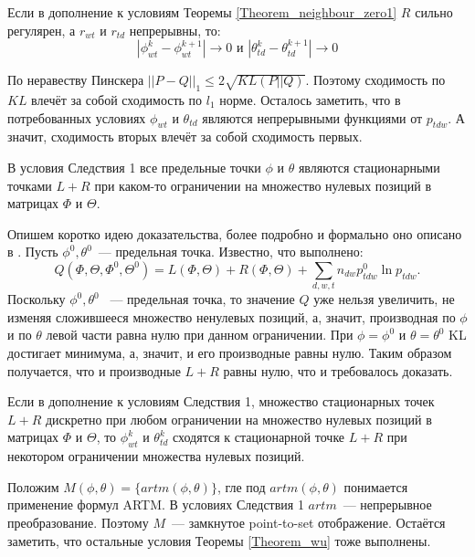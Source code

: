 \documentclass[12pt, twoside]{article}
\begin{document}
\begin{Corollary}
Если в дополнение к условиям Теоремы \ref{Theorem_neighbour_zero1} $R$ сильно регулярен, а $r_{wt}$ и $r_{td}$ непрерывны, то:
\[
|\phi_{wt}^{k} - \phi_{wt}^{k+1}| \to 0 \text{ и } |\theta_{td}^{k} - \theta_{td}^{k+1}| \to 0
\]
\end{Corollary}
\begin{Proof}
По неравеству Пинскера \cite{topsoe2000some} $||P - Q||_1 \leq 2\sqrt{KL(P||Q)}$. Поэтому сходимость по $KL$ влечёт за собой сходимость по $l_1$ норме. Осталось заметить, что в потребованных условиях  $\phi_{wt}$ и $\theta_{td}$ являются непрерывными функциями от $p_{tdw}$. А значит, сходимость вторых влечёт за собой сходимость первых.
\end{Proof}
\begin{Corollary}
В условия Следствия 1 все предельные точки $\phi$ и $\theta$ являются стационарными точками $L +  R$ при каком-то ограничении на множество нулевых позиций в матрицах $\Phi$ и $\Theta$.
\end{Corollary}
\begin{Proof}
Опишем коротко идею доказательства,  более подробно и формально оно описано в \cite{wu1983convergence}. Пусть  $\phi^0, \theta^0$~--- предельная точка. Известно, что выполнено:
\[
Q(\Phi, \Theta, \Phi^0, \Theta^0) =  L(\Phi, \Theta) +  R(\Phi, \Theta) + \sum\limits_{d, w, t} n_{dw} p^0_{tdw} \ln{p_{tdw}}.
\]
Поскольку $\phi^0, \theta^0$ ~--- предельная точка, то значение $Q$ уже нельзя увеличить, не изменяя сложившееся множество ненулевых позиций, а, значит, производная по $\phi$ и по $\theta$ левой части равна нулю при данном ограничении. При $\phi = \phi^0$ и $\theta = \theta^0$ KL достигает минимума, а, значит, и его производные равны нулю. Таким образом получается, что и производные $L +  R$ равны нулю, что и требовалось доказать.
\end{Proof}
\begin{Corollary}
Если в дополнение к условиям Следствия 1, множество стационарных точек $L +  R$ дискретно при любом  ограничении на множество нулевых позиций в матрицах $\Phi$ и $\Theta$, то $\phi_{wt}^{k}$ и $\theta_{td}^{k}$ сходятся к стационарной точке $L +  R$ при некотором ограничении множества нулевых позиций.
\end{Corollary}
\begin{Proof}
Положим $M(\phi, \theta) = \{artm(\phi, \theta)\}$, гле под $artm(\phi, \theta)$ понимается применение формул ARTM. В условиях Следствия 1 $artm$~--- непрерывное преобразование. Поэтому $M$~--- замкнутое point-to-set отображение. Остаётся заметить, что остальные условия Теоремы \ref{Theorem_wu} тоже выполнены.
\end{Proof}
\end{document}
